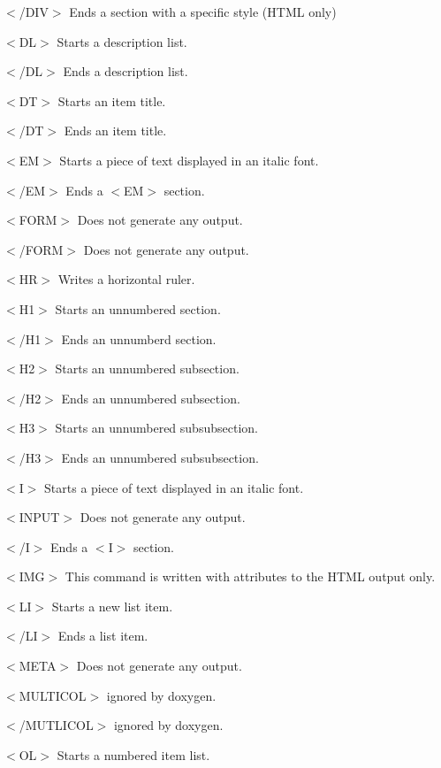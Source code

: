 \begin{DoxyItemize}
\item {\ttfamily $<$/DIV$>$} Ends a section with a specific style (HTML only) 
\item {\ttfamily $<$DL$>$} Starts a description list. 
\item {\ttfamily $<$/DL$>$} Ends a description list. 
\item {\ttfamily $<$DT$>$} Starts an item title. 
\item {\ttfamily $<$/DT$>$} Ends an item title. 
\item {\ttfamily $<$EM$>$} Starts a piece of text displayed in an italic font. 
\item {\ttfamily $<$/EM$>$} Ends a {\ttfamily $<$EM$>$} section. 
\item {\ttfamily $<$FORM$>$} Does not generate any output. 
\item {\ttfamily $<$/FORM$>$} Does not generate any output. 
\item {\ttfamily $<$HR$>$} Writes a horizontal ruler. 
\item {\ttfamily $<$H1$>$} Starts an unnumbered section. 
\item {\ttfamily $<$/H1$>$} Ends an unnumberd section. 
\item {\ttfamily $<$H2$>$} Starts an unnumbered subsection. 
\item {\ttfamily $<$/H2$>$} Ends an unnumbered subsection. 
\item {\ttfamily $<$H3$>$} Starts an unnumbered subsubsection. 
\item {\ttfamily $<$/H3$>$} Ends an unnumbered subsubsection. 
\item {\ttfamily $<$I$>$} Starts a piece of text displayed in an italic font. 
\item {\ttfamily $<$INPUT$>$} Does not generate any output. 
\item {\ttfamily $<$/I$>$} Ends a {\ttfamily $<$I$>$} section. 
\item {\ttfamily $<$IMG$>$} This command is written with attributes to the HTML output only. 
\item {\ttfamily $<$LI$>$} Starts a new list item. 
\item {\ttfamily $<$/LI$>$} Ends a list item. 
\item {\ttfamily $<$META$>$} Does not generate any output. 
\item {\ttfamily $<$MULTICOL$>$} ignored by doxygen. 
\item {\ttfamily $<$/MUTLICOL$>$} ignored by doxygen. 
\item {\ttfamily $<$OL$>$} Starts a numbered item list. 

\end{DoxyItemize}
